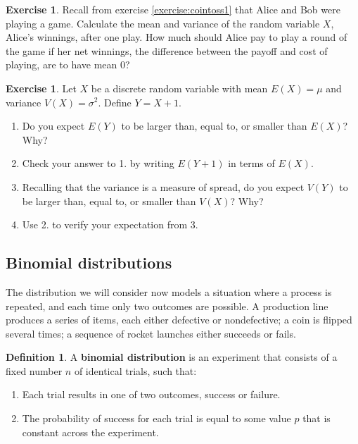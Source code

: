 \documentclass[a4paper,leqno]{article}
\numberwithin{equation}{section}
\theoremstyle{definition}
\newtheorem{defn}[equation]{Definition}
\newtheorem{exercise}[equation]{Exercise}
\theoremstyle{remark}
\newcommand{\df}{\textbf}
\begin{document}
\begin{exercise}
  Recall from exercise \ref{exercise:cointoss1} that Alice and Bob were playing a game. Calculate
  the mean and variance of the random variable $ X $, Alice's winnings, after one play. How much
  should Alice pay to play a round of the game if her net winnings, the difference between the payoff
  and cost of playing, are to have mean 0?
\end{exercise}

\begin{exercise}
  Let $ X $ be a discrete random variable with mean $ E(X) = \mu $ and variance $ V(X) = \sigma^2 $. Define $ Y = X + 1 $.
  \begin{enumerate}
    \item Do you expect $ E(Y) $ to be larger than, equal to, or smaller than $ E(X) $? Why?
    \item Check your answer to 1. by writing $ E(Y + 1) $ in terms of $ E(X) $.
    \item Recalling that the variance is a measure of spread, do you expect $ V(Y) $ to be larger than, equal to, or smaller than $ V(X) $? Why?
    \item Use 2. to verify your expectation from 3.
  \end{enumerate}
\end{exercise}

\subsection{Binomial distributions}
The distribution we will consider now models a situation where a process is repeated, and each time only two outcomes
are possible. A production line produces a series of items, each either defective or nondefective; a
coin is flipped several times; a sequence of rocket launches either succeeds or fails.

\begin{defn}
  A \df{binomial distribution} is an experiment that consists of a fixed number $ n $ of identical trials, such that:
  \begin{enumerate}
    \item Each trial results in one of two outcomes, success or failure.
    \item The probability of success for each trial is equal to some value $ p $ that is constant across the experiment.
  \end{enumerate}
\end{defn}
\end{document}
